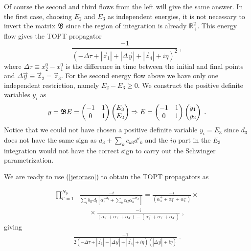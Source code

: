 \documentclass[%
 reprint,
 amsmath,amssymb,
 aps,
]{revtex4-1}
\begin{document}
 
 Of course the second and third flows from the left will give the same answer. In the first case, choosing $E_2$ and $E_3$ as independent energies, it is not necessary to invert the matrix $\mathfrak{B}$ since the region of integration is already $\mathbb{R}_+^2$. This energy flow gives the TOPT propagator
 \begin{equation}
 \frac{-1}{(-\Delta\tau+|\vec{z}_1|+|\Delta\vec{y}|+|\vec{z}_4|+i\eta)^2}\;,
 \end{equation}
 where $\Delta\tau\equiv x_2^0-x_1^0$ is the difference in time between the initial and final points and $\Delta \vec{y}\equiv\vec{z}_2=\vec{z}_3$. For the second energy flow above we have only one independent restriction, namely $E_2-E_3\geq0$. We construct the positive definite variables $y_i$ as
 \[
y=\mathfrak{B}E
=  \left(\begin{array}{@{}cc@{}}
-1 & 1\\
0 & 1
  \end{array}\right) \left(\begin{array}{@{}c@{}}
E_3\\
E_2
  \end{array}\right)\Rightarrow E=\left(\begin{array}{@{}cc@{}}
-1 & 1\\
0 & 1
  \end{array}\right) \left(\begin{array}{@{}c@{}}
y_1\\
y_2
  \end{array}\right)\;.
  \]
 Notice that we could not have chosen a positive definite variable $y_i=E_3$ since $d_3$ does not have the same sign as $d_3+\sum_kc_{k3} d'_k$ and the $i\eta$ part in the $E_3$ integration would not have the correct sign to carry out the Schwinger parametrization.\par
 We are ready to use (\ref{jetoraso}) to obtain the TOPT propagators as
 
 \begin{align}
 \prod_{l'=1}^{N_p}&\frac{-i}{\sum_l b_{ll'}d_l[\alpha^{-d_l}_l+\sum_k c_{kl}\alpha_k^{-d'_k}]}=\frac{-i}{(\alpha^{+}_3+\alpha^{-}_1+\alpha^{-}_4)}\nonumber\times\\
&\;\;\;\;\; \times\frac{-i}{(\alpha^{-}_2+\alpha^{-}_1+\alpha^{-}_4)-(\alpha^{+}_3+\alpha^{-}_1+\alpha^{-}_4)}\;,
\end{align}
giving
\begin{align}
 \frac{-1}{2(-\Delta\tau+|\vec{z}_1|-|\Delta \vec{y}|+|\vec{z}_4|+i\eta)(|\Delta\vec{y}|+i\eta)}\;.
 \end{align}
\end{document}
